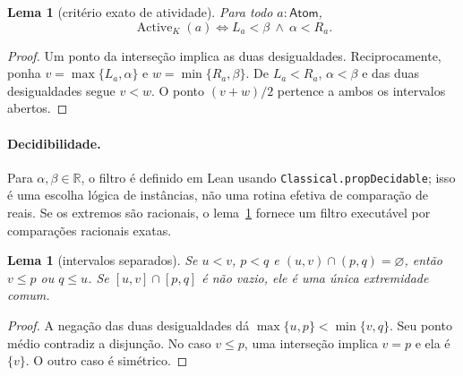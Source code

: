 \documentclass[11pt,a4paper]{article}
\newtheorem{lema}[definicao]{Lema}
\newcommand{\R}{\mathbb R}
\newcommand{\Atoms}{\mathsf{Atom}}
\newcommand{\Act}{\operatorname{Active}}
\newcommand{\code}[1]{\nolinkurl{#1}}
\begin{document}
\begin{lema}[critério exato de atividade]\label{lem:active}
Para todo $a:\Atoms$,
\[
 \Act_K(a)\Longleftrightarrow L_a<\beta\ \land\ \alpha<R_a.
\]
\end{lema}
\begin{proof}
Um ponto da interseção implica as duas desigualdades. Reciprocamente,
ponha $v=\max\{L_a,\alpha\}$ e $w=\min\{R_a,\beta\}$. De
$L_a<R_a$, $\alpha<\beta$ e das duas desigualdades segue $v<w$.
O ponto $(v+w)/2$ pertence a ambos os intervalos abertos.
\end{proof}

\paragraph{Decidibilidade.}
Para $\alpha,\beta\in\R$, o filtro é definido em Lean usando
\code{Classical.propDecidable}; isso é uma escolha lógica de
instâncias, não uma rotina efetiva de comparação de reais.
Se os extremos são racionais, o lema~\ref{lem:active} fornece um filtro
executável por comparações racionais exatas.

\begin{lema}[intervalos separados]\label{lem:separated}
Se $u<v$, $p<q$ e $(u,v)\cap(p,q)=\varnothing$, então
$v\le p$ ou $q\le u$. Se $[u,v]\cap[p,q]$ é não vazio, ele é
uma única extremidade comum.
\end{lema}
\begin{proof}
A negação das duas desigualdades dá
$\max\{u,p\}<\min\{v,q\}$. Seu ponto médio contradiz a
disjunção. No caso $v\le p$, uma interseção implica $v=p$ e
ela é $\{v\}$. O outro caso é simétrico.
\end{proof}
\end{document}
